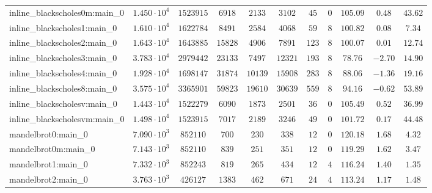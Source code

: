 \begin{tabular}{|l|c|c|c|c|c|c|c|c|c|c|}
inline\_blackscholes0m:main\_0 & $ 1.450 \cdot 10^{4} $ & $ 1523915  $ & $ 6918   $ & $ 2133   $ & $ 3102   $ & $ 45   $ & $ 0    $ & $ 105.09      $ & $ 0.48    $ & $ 43.62   $ \\
inline\_blackscholes1:main\_0  & $ 1.610 \cdot 10^{4} $ & $ 1622784  $ & $ 8491   $ & $ 2584   $ & $ 4068   $ & $ 59   $ & $ 8    $ & $ 100.82      $ & $ 0.08    $ & $ 7.34    $ \\
inline\_blackscholes2:main\_0  & $ 1.643 \cdot 10^{4} $ & $ 1643885  $ & $ 15828  $ & $ 4906   $ & $ 7891   $ & $ 123  $ & $ 8    $ & $ 100.07      $ & $ 0.01    $ & $ 12.74   $ \\
inline\_blackscholes3:main\_0  & $ 3.783 \cdot 10^{4} $ & $ 2979442  $ & $ 23133  $ & $ 7497   $ & $ 12321  $ & $ 193  $ & $ 8    $ & $ 78.76       $ & $ -2.70   $ & $ 14.90   $ \\
inline\_blackscholes4:main\_0  & $ 1.928 \cdot 10^{4} $ & $ 1698147  $ & $ 31874  $ & $ 10139  $ & $ 15908  $ & $ 283  $ & $ 8    $ & $ 88.06       $ & $ -1.36   $ & $ 19.16   $ \\
inline\_blackscholes8:main\_0  & $ 3.575 \cdot 10^{4} $ & $ 3365901  $ & $ 59823  $ & $ 19610  $ & $ 30639  $ & $ 559  $ & $ 8    $ & $ 94.16       $ & $ -0.62   $ & $ 53.89   $ \\
inline\_blackscholesv:main\_0  & $ 1.443 \cdot 10^{4} $ & $ 1522279  $ & $ 6090   $ & $ 1873   $ & $ 2501   $ & $ 36   $ & $ 0    $ & $ 105.49      $ & $ 0.52    $ & $ 36.99   $ \\
inline\_blackscholesvm:main\_0 & $ 1.498 \cdot 10^{4} $ & $ 1523915  $ & $ 7017   $ & $ 2189   $ & $ 3246   $ & $ 49   $ & $ 0    $ & $ 101.72      $ & $ 0.17    $ & $ 44.48   $ \\
mandelbrot0:main\_0            & $ 7.090 \cdot 10^{3} $ & $ 852110   $ & $ 700    $ & $ 230    $ & $ 338    $ & $ 12   $ & $ 0    $ & $ 120.18      $ & $ 1.68    $ & $ 4.32    $ \\
mandelbrot0m:main\_0           & $ 7.143 \cdot 10^{3} $ & $ 852110   $ & $ 839    $ & $ 251    $ & $ 351    $ & $ 12   $ & $ 0    $ & $ 119.29      $ & $ 1.62    $ & $ 3.47    $ \\
mandelbrot1:main\_0            & $ 7.332 \cdot 10^{3} $ & $ 852243   $ & $ 819    $ & $ 265    $ & $ 434    $ & $ 12   $ & $ 4    $ & $ 116.24      $ & $ 1.40    $ & $ 1.35    $ \\
mandelbrot2:main\_0            & $ 3.763 \cdot 10^{3} $ & $ 426127   $ & $ 1383   $ & $ 462    $ & $ 671    $ & $ 24   $ & $ 4    $ & $ 113.24      $ & $ 1.17    $ & $ 1.48    $ \\

\end{tabular}
